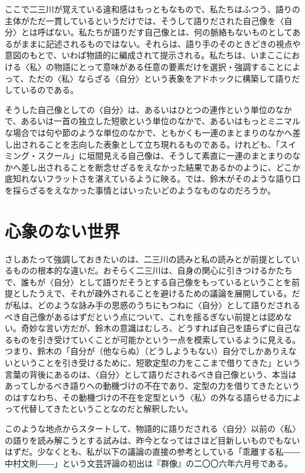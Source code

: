 \documentclass[uplatex,a4paper,oneside,landscape]{jsarticle}
\begin{document}
ここで⼆三川が覚えている違和感はもっともなもので、私たちはふつう、語りの主体がただ⼀貫しているというだけでは、そうして語りだされた⾃⼰像を〈⾃分〉とは呼ばない。私たちが語りだす⾃⼰像とは、何の脈絡もないものとしてあるがままに記述されるものではない。それらは、語り⼿のそのときどきの視点や意図のもとで、いわば物語的に編成されて提⽰される。私たちは、いまここにおける〈私〉の物語にとって意味がある任意の要素だけを選択・強調することによって、ただの〈私〉ならざる〈⾃分〉という表象をアドホックに構築して語りだしているのである。

そうした⾃⼰像としての〈⾃分〉は、あるいはひとつの連作という単位のなかで、あるいは⼀⾸の独⽴した短歌という単位のなかで、あるいはもっとミニマルな場合では句や節のような単位のなかで、ともかくも⼀連のまとまりのなかへ差し出されることを志向した表象として⽴ち現れるものである。けれども、「スイミング・スクール」に垣間⾒える⾃⼰像は、そうして素直に⼀連のまとまりのなかへ差し出されることを断念せざるをえなかった結果であるかのように、どこか底知れないフラットさを湛えているように映る。では、鈴⽊がそのような語り⼝を採らざるをえなかった事情とはいったいどのようなものなのだろうか。

\section{⼼象のない世界}

さしあたって強調しておきたいのは、⼆三川の読みと私の読みとが前提としているものの根本的な違いだ。おそらく⼆三川は、⾃⾝の関⼼に引きつけるかたちで、誰もが〈自分〉として語りだそうとする自己像をもっているということを前提としたうえで、それが疎外されることを避けるための議論を展開している。だが私は、どのような詠み⼿の思惑のうちにもつねに〈自分〉として語りだされるべき⾃⼰像があるはずだという点について、これを揺るぎない前提とは認めない。奇妙な⾔い⽅だが、鈴⽊の意識はむしろ、どうすれば⾃⼰を語らずに⾃⼰なるものを引き受けていくことが可能かという⼀点を模索しているように⾒える。つまり、鈴⽊の「⾃分が（他ならぬ）（どうしようもない）⾃分でしかありえないということを引き受けるために、短歌定型の⼒をここまで借りてきた」という⾔葉の背後にあるのは、〈自分〉として語りだされるべき⾃⼰像という、本当はあってしかるべき語りへの動機づけの不在であり、定型の⼒を借りてきたというのはすなわち、その動機づけの不在を定型という〈私〉の外なる語らせる⼒によって代替してきたということなのだと解釈したい。

このような地点からスタートして、物語的に語りだされる〈⾃分〉以前の〈私〉の語りを読み解こうとする試みは、昨今となってはさほど⽬新しいものでもないはずだ。少なくとも、私が以下の議論の直接の参考としている「乖離する私――中村⽂則――」という⽂芸評論の初出は『群像』の⼆〇〇六年六⽉号である。
\end{document}
